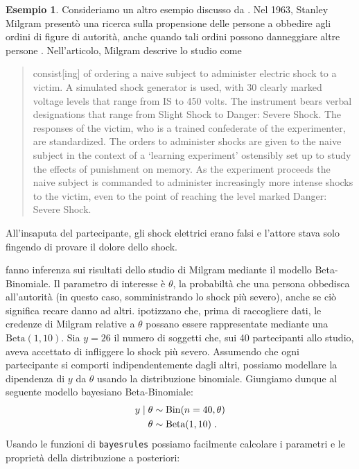 \documentclass[
  11pt,
  italian,
  a4paper,
  extrafontsizes,onecolumn,openright
  ]{memoir}
\DeclareMathOperator{\Bin}{Bin} %
\theoremstyle{definition}
\theoremstyle{definition}
\newtheorem{example}{Esempio}[chapter]
\theoremstyle{definition}
\theoremstyle{definition}
\theoremstyle{remark}
\begin{document}
\begin{example}

Consideriamo un altro esempio discusso da \textcite{Johnson2022bayesrules}. Nel 1963, Stanley Milgram presentò una ricerca sulla propensione delle persone a obbedire agli ordini di figure di autorità, anche quando tali ordini possono danneggiare altre persone \autocite{milgram1963behavioral}. Nell'articolo, Milgram descrive lo studio come

\begin{quote}
consist{[}ing{]} of ordering a naive subject to administer electric shock to a victim. A simulated shock generator is used, with 30 clearly marked voltage levels that range from IS to 450 volts. The instrument bears verbal designations that range from Slight Shock to Danger: Severe Shock. The responses of the victim, who is a trained confederate of the experimenter, are standardized. The orders to administer shocks are given to the naive subject in the context of a `learning experiment' ostensibly set up to study the effects of punishment on memory. As the experiment proceeds the naive subject is commanded to administer increasingly more intense shocks to the victim, even to the point of reaching the level marked Danger: Severe Shock.
\end{quote}

\noindent
All'insaputa del partecipante, gli shock elettrici erano falsi e l'attore stava solo fingendo di provare il dolore dello shock.

\textcite{Johnson2022bayesrules} fanno inferenza sui risultati dello studio di Milgram mediante il modello Beta-Binomiale. Il parametro di interesse è \(\theta\), la probabiltà che una persona obbedisca all'autorità (in questo caso, somministrando lo shock più severo), anche se ciò significa recare danno ad altri. \textcite{Johnson2022bayesrules} ipotizzano che, prima di raccogliere dati, le credenze di Milgram relative a \(\theta\) possano essere rappresentate mediante una \(\text{Beta}(1, 10)\). Sia \(y = 26\) il numero di soggetti che, sui 40 partecipanti allo studio, aveva accettato di infliggere lo shock più severo. Assumendo che ogni partecipante si comporti indipendentemente dagli altri, possiamo modellare la dipendenza di \(y\) da \(\theta\) usando la distribuzione binomiale. Giungiamo dunque al seguente modello bayesiano Beta-Binomiale:
\begin{align}
y \mid \theta & \sim \Bin(n = 40, \theta) \notag\\
\theta & \sim \text{Beta}(1, 10) \; . \notag
\end{align}
Usando le funzioni di \texttt{bayesrules} possiamo facilmente calcolare i parametri e le proprietà della distribuzione a posteriori:


\end{example}
\end{document}
